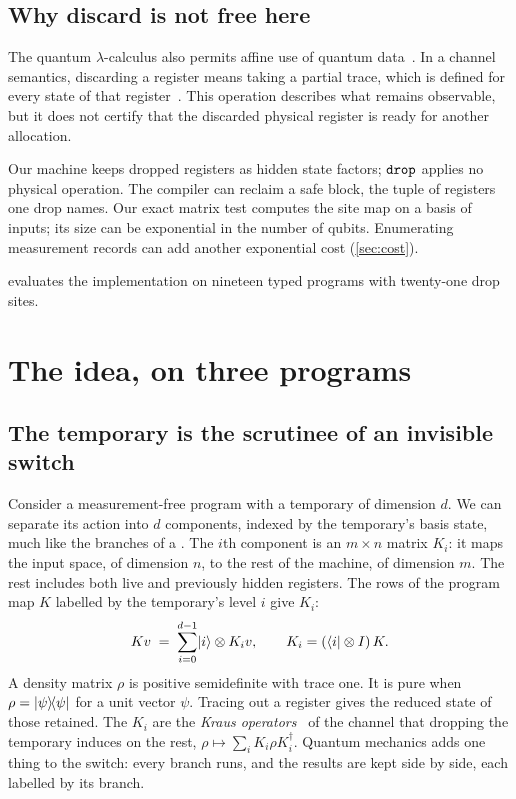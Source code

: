\documentclass[acmsmall,screen,review,anonymous,nonacm]{acmart}
\begin{document}
\subsection*{Why discard is not free here}

The quantum $\lambda$-calculus also permits affine use of quantum
data~\cite{SelingerValiron2006}. In a channel semantics, discarding a
register means taking a partial trace, which is defined for every state
of that register~\cite{Selinger2004Towards}. This operation describes
what remains observable, but it does not certify that the discarded physical
register is ready for another allocation.

Our machine keeps dropped registers as hidden state factors; $\texttt{drop}$
applies no physical operation. The compiler can reclaim a safe block, the tuple of registers one drop names.
Our exact matrix test computes the site map on a basis of inputs;
its size can be exponential in the number of qubits. Enumerating
measurement records can add another exponential cost (\cref{sec:cost}).

 evaluates the implementation on nineteen typed programs
with twenty-one drop sites.

\section{The idea, on three programs}\label{sec:overview}

\subsection{The temporary is the scrutinee of an invisible switch}

Consider a measurement-free program with a temporary of dimension $d$.
We can separate its action into $d$ components, indexed by the temporary's
basis state, much like the branches of a . The $i$th
component is an $m\times n$ matrix $K_i$: it maps the input space, of
dimension $n$, to the rest of the machine, of dimension $m$. The rest
includes both live and previously hidden registers. The rows of the
program map $K$ labelled by the temporary's level $i$ give $K_i$:
\[
  K v \;=\; \sum_{i=0}^{d-1} \lvert i \rangle \otimes K_i v ,
  \qquad K_i = (\langle i \rvert \otimes I)\,K .
\]
A density matrix $\rho$ is positive semidefinite with trace one.
It is pure when $\rho=\lvert \psi \rangle\!\langle \psi \rvert$ for a unit vector $\psi$.
Tracing out a register gives the reduced state of those retained.
The $K_i$ are the \emph{Kraus operators}~\cite{Kraus1983States} of the
channel that dropping the temporary induces on the rest,
$\rho \mapsto \sum_i K_i \rho K_i^{\dagger}$. Quantum mechanics adds one
thing to the switch: every branch runs, and the results are kept side by
side, each labelled by its branch.
\end{document}
